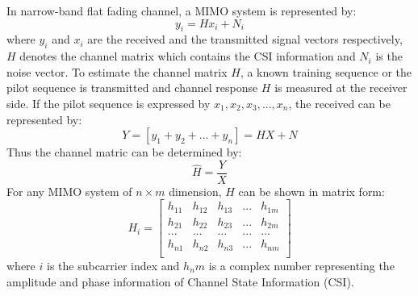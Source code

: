 In narrow-band flat fading channel, a MIMO system is represented by:
\begin{equation}
    y_i = Hx_i + N_i
\end{equation}
where $y_i$ and $x_i$ are the received and the transmitted signal
vectors respectively, $H$ denotes the channel matrix which contains the CSI information and $N_i$ is the noise vector. To estimate the channel matrix $H$, a known training sequence or the pilot sequence is transmitted and channel response $H$ is measured at the receiver side. If the pilot sequence is expressed by $x_1, x_2, x_3, ... , x_n$, the received can be represented by: 
\begin{equation}
    Y = [y_1 + y_2 + ... + y_n] = HX + N
\end{equation}
Thus the channel matric can be determined by: 
\begin{equation}
    \hat{H} = \frac{Y}{X}
\end{equation}
For any MIMO system of $n \times m$ dimension, $H$ can be shown in matrix form:
\begin{equation}
    H_i = \begin{bmatrix}
    h_{11} & h_{12} & h_{13} & ... & h_{1m}\\ 
    h_{21} & h_{22} & h_{23} & ... & h_{2m}\\ 
    ... & ... & ... & ... & ... \\
    h_{n1} & h_{n2} & h_{n3} & ... & h_{nm}\\ 
    \end{bmatrix}
\end{equation}
where $i$ is the subcarrier index and $h_nm$ is a complex number representing the amplitude and phase information of Channel State Information (CSI).

